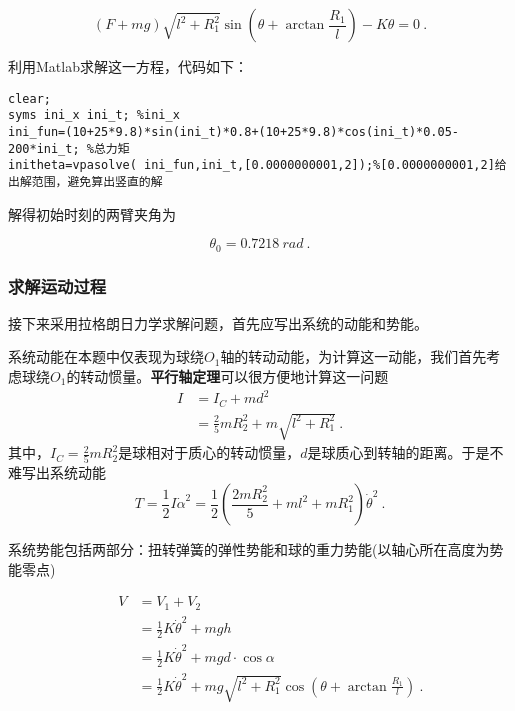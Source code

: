 \documentclass[a4paper,c5size,twoside,UTF8]{ctexart} %
\numberwithin{equation}{section}   %
\begin{document}
\begin{equation}
    (F+mg)\sqrt{l^2+R_1^2}  \sin(\theta+\arctan\frac{R_1}{l})-K\theta=0~.
\end{equation}

利用Matlab求解这一方程，代码如下：

\vspace{-1.7em}

\begin{lstlisting}
clear;
syms ini_x ini_t; %ini_x
ini_fun=(10+25*9.8)*sin(ini_t)*0.8+(10+25*9.8)*cos(ini_t)*0.05-200*ini_t; %总力矩
initheta=vpasolve( ini_fun,ini_t,[0.0000000001,2]);%[0.0000000001,2]给出解范围，避免算出竖直的解
\end{lstlisting}


解得初始时刻的两臂夹角为

\begin{equation}
    \theta_0=0.7218 ~rad~.
\end{equation}


\subsubsection{求解运动过程}

接下来采用拉格朗日力学求解问题，首先应写出系统的动能和势能。

系统动能在本题中仅表现为球绕$O_1$轴的转动动能，为计算这一动能，我们首先考虑球绕$O_1$的转动惯量。\textbf{平行轴定理}可以很方便地计算这一问题
\begin{equation}
    \begin{aligned}
      I&=I_C + md^2\\
         &=\frac{2}{5}mR_2^2+m\sqrt{l^2+R_1^2}~.
    \end{aligned}
\end{equation}
其中，$I_C=\frac{2}{5}mR_2^2$是球相对于质心的转动惯量，$d$是球质心到转轴的距离。于是不难写出系统动能
\begin{equation}
    T= \frac{1}{2}I\dot{\alpha}^2=\frac{1}{2}\left(\frac{2 m R_{2}^{2}}{5}+m l^{2}+m R_{1}^{2}\right) \dot{\theta}^{2}~.
\end{equation}


系统势能包括两部分：扭转弹簧的弹性势能和球的重力势能(以轴心所在高度为势能零点)

\begin{equation}
    \begin{aligned}
       ~~~~~~~ V&=V_1+V_2\\
         &=\frac{1}{2}K\dot{\theta}^2+mgh\\
         &=\frac{1}{2}K\dot{\theta}^2+mgd\cdot\cos\alpha\\
         &=\frac{1}{2}K\dot{\theta}^2+mg\sqrt{l^2+R_1^2}\cos(\theta + \arctan{\frac{R_1}{l}})~.
    \end{aligned}
\end{equation}
\end{document}
